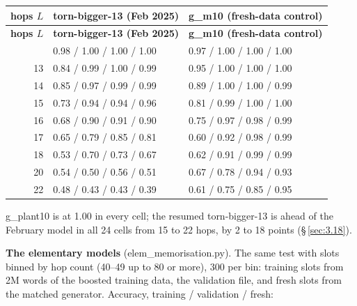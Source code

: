 \documentclass[paper=a4,fontsize=11pt,DIV=11,parskip=half,headings=small,numbers=noendperiod]{scrartcl}
\DeclareRobustCommand{\lead}[1]{\textsf{\bfseries\color{accent}#1}}
\DeclareRobustCommand{\code}[1]{{\fontseries{m}\ttfamily #1}}
\DeclareRobustCommand{\hdr}[1]{\textsf{\bfseries #1}}
\begin{document}
{\small\nopagebreak[4]
\begin{longtable}{@{}r l l@{}}
\toprule
\hdr{hops $L$} & \hdr{\code{torn-\allowbreak{}bigger-\allowbreak{}13} (Feb 2025)} & \hdr{\code{g\_\allowbreak{}m10} (fresh-data control)} \\
\midrule
\endfirsthead
\toprule
\hdr{hops $L$} & \hdr{\code{torn-\allowbreak{}bigger-\allowbreak{}13} (Feb 2025)} & \hdr{\code{g\_\allowbreak{}m10} (fresh-data control)} \\
\midrule
\endhead
\bottomrule
\endlastfoot
12 & 0.98 / 1.00 / 1.00 / 1.00 & 0.97 / 1.00 / 1.00 / 1.00 \\
13 & 0.84 / 0.99 / 1.00 / 0.99 & 0.95 / 1.00 / 1.00 / 1.00 \\
14 & 0.85 / 0.97 / 0.99 / 0.99 & 0.89 / 1.00 / 1.00 / 0.99 \\
15 & 0.73 / 0.94 / 0.94 / 0.96 & 0.81 / 0.99 / 1.00 / 1.00 \\
16 & 0.68 / 0.90 / 0.91 / 0.90 & 0.75 / 0.97 / 0.98 / 0.99 \\
17 & 0.65 / 0.79 / 0.85 / 0.81 & 0.60 / 0.92 / 0.98 / 0.99 \\
18 & 0.53 / 0.70 / 0.73 / 0.67 & 0.62 / 0.91 / 0.99 / 0.99 \\
20 & 0.54 / 0.50 / 0.56 / 0.51 & 0.67 / 0.78 / 0.94 / 0.93 \\
22 & 0.48 / 0.43 / 0.43 / 0.39 & 0.61 / 0.75 / 0.85 / 0.95 \\
\end{longtable}}

\code{g\_\allowbreak{}plant10} is at 1.00 in every cell; the resumed
\code{torn-\allowbreak{}bigger-\allowbreak{}13} is ahead of the February model in all 24 cells from 15 to 22
hops, by 2 to 18 points (\S\,\ref{sec:3.18}).

\lead{The elementary models} (\code{elem\_\allowbreak{}memorisation.\allowbreak{}py}). The same test with slots
binned by hop count (40–49 up to 80 or more), 300 per bin: training slots from 2M words of the boosted training
data, the validation file, and fresh slots from the matched generator. Accuracy, training / validation / fresh:
\end{document}
